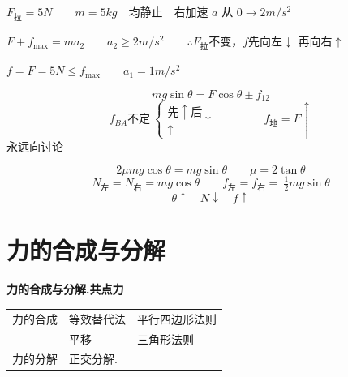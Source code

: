 

$F_{\text{拉}}=5\unit{N}$　　$m=5\unit{kg}$　均静止　右加速 $a$ 从 $0\to 2\unit{m/s^2}$ %

$F+f_{\max}=ma_2$　　$a_2\ge 2\unit{m/s^2}$　　$\therefore F_{\text{拉}}$不变，$f$先向左$\downarrow$ 再向右$\uparrow$

$f=F=5\unit{N}\le f_{\max}$　　$a_1=1\unit{m/s^2}$

\begin{problem}
\begin{solution}
\[ mg\sin\theta=F\cos\theta\pm f_{12} \]
\[ f_{BA}\text{不定}\ \begin{cases}\text{先}\uparrow\text{后}\downarrow\\ \uparrow\end{cases}\qquad\qquad f_{\text{地}}=F\uparrow \]
永远向讨论 %
\end{solution}
\end{problem}

\begin{problem}
\begin{solution}
\[ 2\mu mg\cos\theta=mg\sin\theta\qquad \mu=2\tan\theta \] %
\[ N_{\text{左}}=N_{\text{右}}=mg\cos\theta\qquad f_{\text{左}}=f_{\text{右}}=\ \tfrac12 mg\sin\theta \] %
\[ \theta\uparrow\quad N\downarrow\quad f\uparrow \]
\end{solution}
\end{problem}


\section{力的合成与分解}
\textbf{力的合成与分解.}\quad \textbf{共点力}

\begin{tabular}{@{}lll@{}}
力的合成 & 等效替代法 & 平行四边形法则 \\
 & 平移 & 三角形法则 \\
力的分解 & 正交分解. & \\
\end{tabular}

